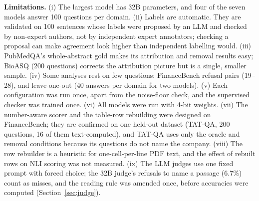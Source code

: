 \documentclass[conference]{IEEEtran}
\begin{document}
\textbf{Limitations.} (i) The largest model has 32B parameters, and four of the seven models answer 100 questions per domain. (ii) Labels are automatic.
They are validated on 100 sentences whose labels were proposed by an LLM and checked by non-expert authors, not by independent expert annotators;
checking a proposal can make agreement look higher than independent labelling would. (iii) PubMedQA's whole-abstract gold makes its attribution and
removal results easy; BioASQ (200 questions) corrects the attribution picture but is a single, smaller sample. (iv) Some analyses rest
on few questions: FinanceBench refusal pairs (19--28), and leave-one-out (40 answers per domain for two models). (v) Each configuration was run once,
apart from the noise-floor check, and the supervised checker was trained once. (vi) All models were run with 4-bit weights. (vii) The number-aware
scorer and the table-row rebuilding were designed on FinanceBench; they are confirmed on one held-out dataset (TAT-QA, 200 questions, 16 of them
text-computed), and TAT-QA uses only the oracle and removal conditions because its questions do not name the company. (viii) The row rebuilder is a
heuristic for one-cell-per-line PDF text, and the effect of rebuilt rows on NLI scoring was not measured. (ix) The LLM judges use one fixed prompt
with forced choice; the 32B judge's refusals to name a passage (6.7\%) count as misses, and the reading rule was amended once, before accuracies were
computed (Section~\ref{sec:judge}).

\end{document}
